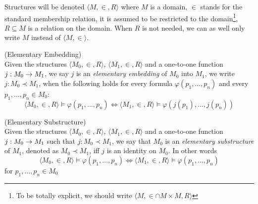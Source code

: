 Structures will be denoted $\langle M, \in, R \rangle$ where $M$ is a domain, $\in$ stands for the standard membership relation, it is assumed to be restricted to the domain\footnote{To be totally explicit, we should write $\langle M, \in \cap M \times M, R \rangle$}, $R \subseteq M$ is a relation on the domain. When $R$ is not needed, we can as well only write $M$ instead of $\langle M, \in \rangle$.

\begin{definition}{(Elementary Embedding)}\label{def:elementary_embedding}\\
Given the structures $\langle M_0, \in, R \rangle$, $\langle M_1, \in, R \rangle$ and a one-to-one function $j: M_0 \rightarrow M_1$, we say $j$ is an \emph{elementary embedding} of $M_0$ into $M_1$, we write $j: M_0 \prec M_1$, when the following holds for every formula $\varphi(p_1, \ldots, p_n)$ and every $p_1, \ldots, p_n \in M_0$:
\begin{equation}
\langle M_0, \in, R \rangle \models \varphi(p_1, \ldots, p_n) \iff \langle M_1, \in, R \rangle  \models \varphi(j(p_1), \ldots, j(p_n))
\end{equation}
\end{definition}


\begin{definition}{(Elementary Substructure)}\label{def:elementary_substructure}\\
Given the structures $\langle M_0, \in, R \rangle$, $\langle M_1, \in, R \rangle$ and a one-to-one function $j: M_0 \rightarrow M_1$ such that $j: M_0 \prec M_1$, we say that $M_0$ is an \emph{elementary substructure} of $M_1$, denoted as $M_0 \prec M_1$, iff $j$ is an identity on $M_0$. In other words
\begin{equation}
\langle M_0, \in, R \rangle \models \varphi(p_1, \ldots, p_n) \iff \langle M_1, \in, R \rangle  \models \varphi(p_1, \ldots, p_n)
\end{equation}
for $p_1, \ldots, p_n \in M_0$
\end{definition}

